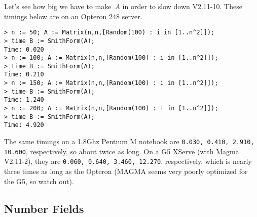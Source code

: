 Let's see how big we have to make~$A$ in order
to slow down \magma{} V2.11-10. 
 These timings below are on
an Opteron 248 server. 

\begin{verbatim}
> n := 50; A := Matrix(n,n,[Random(100) : i in [1..n^2]]);
> time B := SmithForm(A);
Time: 0.020
> n := 100; A := Matrix(n,n,[Random(100) : i in [1..n^2]]);
> time B := SmithForm(A);
Time: 0.210
> n := 150; A := Matrix(n,n,[Random(100) : i in [1..n^2]]);
> time B := SmithForm(A);
Time: 1.240
> n := 200; A := Matrix(n,n,[Random(100) : i in [1..n^2]]);
> time B := SmithForm(A);
Time: 4.920
\end{verbatim}
\begin{remark}
The same timings on a 1.8Ghz Pentium M notebook are 
{\tt 0.030, 0.410, 2.910, 10.600}, respectively, so about
twice as long.
On a G5 XServe (with Magma V2.11-2), they are 
{\tt 0.060, 0.640, 3.460, 12.270}, respectively, which
is nearly three times as long as the Opteron
(MAGMA seems very poorly optimized for the G5, so watch out).
\end{remark}

\begin{comment}
\magma{} can also work with finitely generated abelian groups.
\begin{verbatim}
> G := AbelianGroup([3,5,18]);
> G;
Abelian Group isomorphic to Z/3 + Z/90
Defined on 3 generators
Relations:
    3*G.1 = 0
    5*G.2 = 0
    18*G.3 = 0
> #G;
270
> H := sub<G | [G.1+G.2]>;
> #H;
15
> G/H;
Abelian Group isomorphic to Z/18
\end{verbatim}
\end{comment}

\subsection{Number Fields}
\begin{comment}
\magma{} has many commands for doing basic arithmetic with
$\Qbar$.
\begin{verbatim}
> Qbar := AlgebraicClosure(RationalField());
> Qbar;
> S<x> := PolynomialRing(Qbar);
> r := Roots(x^3-2);
> r;
[
    <r1, 1>,
    <r2, 1>,
    <r3, 1>
]
> a := r[1][1];
> MinimalPolynomial(a);
x^3 - 2
> s := Roots(x^2-7);
> b := s[1][1];
> MinimalPolynomial(b);
x^2 - 7
> a+b;
r4 + r1
> MinimalPolynomial(a+b);
x^6 - 21*x^4 - 4*x^3 + 147*x^2 - 84*x - 339
> Trace(a+b);
0
> Norm(a+b);
-339
\end{verbatim}
There are few commands for general algebraic number fields,
so usually we work in specific finitely generated subfields:
\begin{verbatim}
> MinimalPolynomial(a+b);
x^6 - 21*x^4 - 4*x^3 + 147*x^2 - 84*x - 339

> K := NumberField($1) ;  // $1 = result of previous computation.
> K;
Number Field with defining polynomial x^6 - 21*x^4 - 4*x^3 + 
    147*x^2 - 84*x - 339 over the Rational Field
\end{verbatim}
\end{comment}

